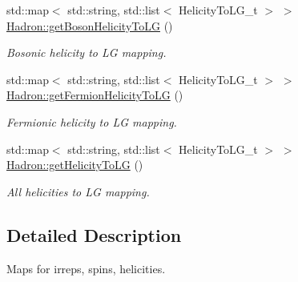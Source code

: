 \begin{DoxyCompactItemize}
\item 
std\+::map$<$ std\+::string, std\+::list$<$ Helicity\+To\+L\+G\+\_\+t $>$ $>$ \mbox{\hyperlink{namespaceHadron_a82bbcfd69a36dd0f63d6181069ff7393}{Hadron\+::get\+Boson\+Helicity\+To\+LG}} ()
\begin{DoxyCompactList}\small\item\em Bosonic helicity to LG mapping. \end{DoxyCompactList}\item 
std\+::map$<$ std\+::string, std\+::list$<$ Helicity\+To\+L\+G\+\_\+t $>$ $>$ \mbox{\hyperlink{namespaceHadron_af7b75d50b2ca47d90a4d42ff7152bf4d}{Hadron\+::get\+Fermion\+Helicity\+To\+LG}} ()
\begin{DoxyCompactList}\small\item\em Fermionic helicity to LG mapping. \end{DoxyCompactList}\item 
std\+::map$<$ std\+::string, std\+::list$<$ Helicity\+To\+L\+G\+\_\+t $>$ $>$ \mbox{\hyperlink{namespaceHadron_aeab17d669da3fa4a904236091bd5384f}{Hadron\+::get\+Helicity\+To\+LG}} ()
\begin{DoxyCompactList}\small\item\em All helicities to LG mapping. \end{DoxyCompactList}\end{DoxyCompactItemize}


\subsection{Detailed Description}
Maps for irreps, spins, helicities. 

